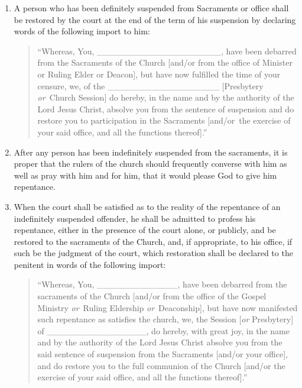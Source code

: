 \documentclass[
]{book}
\begin{document}
\begin{enumerate}
\def\labelenumi{\arabic{enumi}.}
\item
  \protect\hypertarget{40}{\href{}{}}A person who has been definitely suspended from Sacraments or office shall be restored by the court at the end of the term of his suspension by declaring words of the following import to him:

  \begin{quote}
  ``Whereas, You, \_\_\_\_\_\_\_\_\_\_\_\_\_\_\_\_\_\_\_\_, have been debarred from the Sacraments of the Church {[}and/or from the office of Minister or Ruling Elder or Deacon{]}, but have now fulfilled the time of your censure, we, of the \_\_\_\_\_\_\_\_\_\_\_\_\_\_\_\_\_\_ {[}Presbytery \emph{or}~Church Session{]} do hereby, in the name and by the authority of the Lord Jesus Christ, absolve you from the sentence of suspension and do restore you to participation in the Sacraments {[}and/or~the exercise of your said office, and all the functions thereof{]}.''
  \end{quote}
\item
  After any person has been indefinitely suspended from the sacraments, it is proper that the rulers of the church should frequently converse with him as well as pray with him and for him, that it would please God to give him repentance.
\item
  When the court shall be satisfied as to the reality of the repentance of an indefinitely suspended offender, he shall be admitted to profess his repentance, either in the presence of the court alone, or publicly, and be restored to the sacraments of the Church, and, if appropriate, to his office, if such be the judgment of the court, which restoration shall be declared to the penitent in words of the following import:

  \begin{quote}
  ``Whereas, You, \_\_\_\_\_\_\_\_\_\_\_\_\_, have been debarred from the sacraments of the Church {[}and/or from the office of the Gospel Ministry \emph{or}~Ruling Eldership \emph{or}~Deaconship{]}, but have now manifested such repentance as satisfies the church, we, the Session {[}\emph{or} Presbytery{]} of \_\_\_\_\_\_\_\_\_\_\_\_\_\_\_\_, do hereby, with great joy, in the name and by the authority of the Lord Jesus Christ absolve you from the said sentence of suspension from the Sacraments {[}and/or your office{]}, and do restore you to the full communion of the Church {[}and/or the exercise of your said office, and all the functions thereof{]}.''
  \end{quote}


\end{enumerate}
\end{document}
